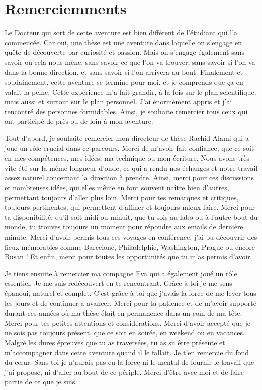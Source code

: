 \section*{Remerciemments}
 

Le Docteur qui sort de cette aventure est bien différent de l'étudiant qui l'a commencée. Car oui, une thèse est une aventure dans laquelle on s'engage en quête de découverte par curiosité et passion.
Mais on s'engage également sans savoir où cela nous mène, sans savoir ce que l'on va trouver, sans savoir si l'on va dans la bonne direction, et sans savoir si l'on arrivera au bout.
Finalement et soudainement, cette aventure se termine pour moi, et je comprends que ça en valait la peine. 
Cette expérience m'a fait grandir, à la fois sur le plan scientifique, mais aussi et surtout sur le plan personnel.
J'ai énormément appris et j'ai rencontré des personnes formidables.
Ainsi, je souhaite remercier tous ceux qui ont participé de près ou de loin à mon aventure.



Tout d'abord, je souhaite remercier mon directeur de thèse Rachid Alami qui a joué un rôle crucial dans ce parcours.
Merci de m'avoir fait confiance, que ce soit en mes compétences, mes idées, ma technique ou mon écriture.
Nous avons très vite été sur la même longueur d'onde, ce qui a rendu nos échanges et notre travail assez naturel concernant la direction à prendre.
Ainsi, merci pour ces discussions et nombreuses idées, qui elles même en font souvent naître bien d'autres, permettant toujours d'aller plus loin. 
Merci pour tes remarques et critiques, toujours pertinentes, qui permettent d'affiner et toujours mieux faire.
Merci pour ta disponibilité, qu'il soit midi ou minuit, que tu sois au labo ou à l'autre bout du monde, tu trouves toujours un moment pour répondre aux emails de dernière minute.
Merci d'avoir permis tous ces voyages en conférence, j'ai pu découvrir des lieux mémorables comme Barcelone, Philadelphie, Washington, Prague ou encore Busan ! 
Et enfin, merci pour toutes les opportunités que tu m'as permis d'avoir.



Je tiens ensuite à remercier ma compagne Eva qui a également joué un rôle essentiel. 
Je me suis redécouvert en te rencontrant. Grâce à toi je me sens épanoui, naturel et complet. C'est grâce à toi que j'avais la force de me lever tous les jours et de continuer à avancer. 
Merci pour ta patience et de m'avoir supporté durant ces années où ma thèse était en permanence dans un coin de ma tête.  
Merci pour tes petites attentions et considérations. 
Merci d'avoir accepté que je ne sois pas toujours présent, que ce soit en soirée, en weekend ou en vacances. 
Malgré les dures épreuves que tu as traversées, tu as su être présente et m'accompagner dans cette aventure quand il le fallait.
Je t'en remercie du fond du cœur.
Sans toi je n'aurais pas eu la force ni le mental de fournir le travail que j'ai proposé, ni d'aller au bout de ce périple.
Merci d'être avec moi et de faire partie de ce que je suis. 


